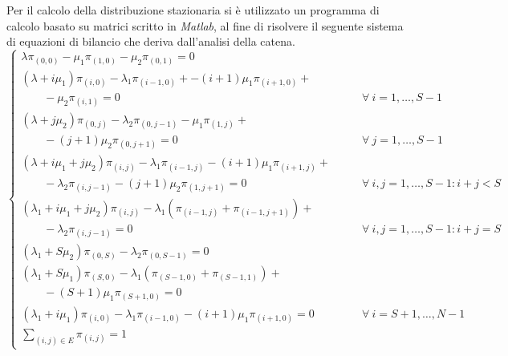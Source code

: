 Per il calcolo della distribuzione stazionaria si è utilizzato un programma di
calcolo basato su matrici scritto in \emph{Matlab}, al fine di risolvere il
seguente sistema di equazioni di bilancio che deriva dall'analisi della catena.
%
\begin{displaymath}
\left\{ \begin{array}{ll}

\lambda \pi_{(0,0)} - \mu_1 \pi_{(1,0)} -\mu_{2} \pi_{(0,1)} = 0 & \\[4pt]

(\lambda+i\mu_1)\pi_{(i,0)} - \lambda_1\pi_{(i-1,0)} + - (i+1)\mu_1\pi_{(i+1,0)}
+ &\\
\qquad - \mu_2\pi_{(i,1)} = 0 & 
\qquad \forall \ i = 1, \ldots, S-1  \\[4pt]  

(\lambda+j\mu_2)\pi_{(0,j)} - \lambda_2\pi_{(0,j-1)} - \mu_1\pi_{(1,j)} + &\\
\qquad-(j+1)\mu_2\pi_{(0,j+1)} = 0 & 
\qquad \forall \ j = 1, \ldots, S-1 \\[4pt]

(\lambda+i\mu_1+j\mu_2)\pi_{(i,j)} - \lambda_1\pi_{(i-1,j)} -
(i+1)\mu_1\pi_{(i+1,j)}+ &\\
\qquad - \lambda_2\pi_{(i,j-1)} -(j+1)\mu_2\pi_{(1,j+1)} = 0 & \qquad \forall \
  i,j=1,\ldots,S-1 : i+j < S \\[4pt]

(\lambda_1+i\mu_1+j\mu_2)\pi_{(i,j)} - \lambda_1(\pi_{(i-1,j)}+\pi_{(i-1,j+1)})
+ &\\
\qquad - \lambda_2\pi_{(i,j-1)} = 0 & 
\qquad \forall \ i,j=1,\ldots,S-1 : i+j = S \\[4pt]

(\lambda_1+S\mu_2)\pi_{(0,S)} - \lambda_2\pi_{(0,S-1)} = 0 & \\[4pt]

(\lambda_1+S\mu_1)\pi_{(S,0)} - \lambda_1(\pi_{(S-1,0)}+\pi_{(S-1,1)}) + &\\
\qquad -(S+1)\mu_1\pi_{(S+1,0)} = 0 & \\[4pt]

(\lambda_1+i\mu_1)\pi_{(i,0)} - \lambda_1\pi_{(i-1,0)} - (i+1)\mu_1\pi_{(i+1,0)}
= 0 & \qquad \forall \ i = S+1,\ldots,N-1 \\[4pt]

\sum_{(i,j) \in E} \pi_{(i,j)} = 1 & 

\end{array} \right .
\end{displaymath}


